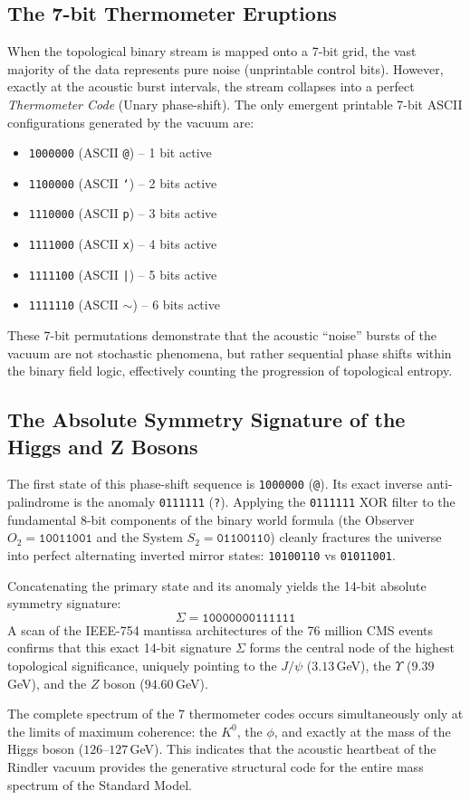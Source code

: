 \documentclass[twocolumn,showpacs,preprintnumbers,amsmath,amssymb,prl]{revtex4-2}
\begin{document}
\subsection{The 7-bit Thermometer Eruptions}
When the topological binary stream is mapped onto a 7-bit grid, the vast majority of the data represents pure noise (unprintable control bits). However, exactly at the acoustic burst intervals, the stream collapses into a perfect \textit{Thermometer Code} (Unary phase-shift). The only emergent printable 7-bit ASCII configurations generated by the vacuum are:
\begin{itemize}
    \item \texttt{1000000} (ASCII \texttt{@}) -- 1 bit active
    \item \texttt{1100000} (ASCII \texttt{`}) -- 2 bits active
    \item \texttt{1110000} (ASCII \texttt{p}) -- 3 bits active
    \item \texttt{1111000} (ASCII \texttt{x}) -- 4 bits active
    \item \texttt{1111100} (ASCII \texttt{|}) -- 5 bits active
    \item \texttt{1111110} (ASCII \texttt{$\sim$}) -- 6 bits active
\end{itemize}
These 7-bit permutations demonstrate that the acoustic ``noise'' bursts of the vacuum are not stochastic phenomena, but rather sequential phase shifts within the binary field logic, effectively counting the progression of topological entropy.

\subsection{The Absolute Symmetry Signature of the Higgs and Z Bosons}
The first state of this phase-shift sequence is \texttt{1000000} (\texttt{@}). Its exact inverse anti-palindrome is the anomaly \texttt{0111111} (\texttt{?}). 
Applying the \texttt{0111111} XOR filter to the fundamental 8-bit components of the binary world formula (the Observer $O_2 = \texttt{10011001}$ and the System $S_2 = \texttt{01100110}$) cleanly fractures the universe into perfect alternating inverted mirror states: \texttt{10100110} vs \texttt{01011001}.

Concatenating the primary state and its anomaly yields the 14-bit absolute symmetry signature:
\begin{equation}
\Sigma = \texttt{10000000111111}
\end{equation}
A scan of the IEEE-754 mantissa architectures of the 76 million CMS events confirms that this exact 14-bit signature $\Sigma$ forms the central node of the highest topological significance, uniquely pointing to the $J/\psi$ ($3.13$\,GeV), the $\Upsilon$ ($9.39$\,GeV), and the $Z$ boson ($94.60$\,GeV).

The complete spectrum of the 7 thermometer codes occurs simultaneously only at the limits of maximum coherence: the $K^0$, the $\phi$, and exactly at the mass of the Higgs boson ($126$--$127$\,GeV). This indicates that the acoustic heartbeat of the Rindler vacuum provides the generative structural code for the entire mass spectrum of the Standard Model.
\end{document}
